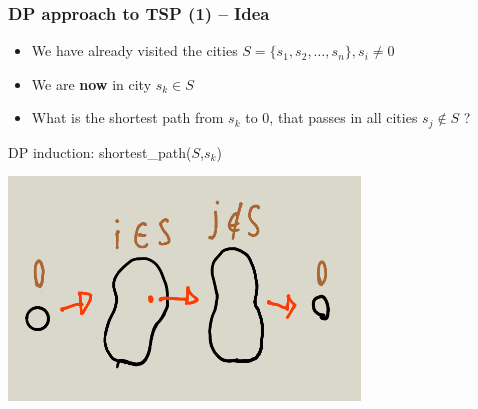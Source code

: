 \begin{frame}
  \frametitle{DP approach to TSP (1) -- Idea}

  {\smaller
    \begin{block}{}
      \begin{itemize}
      \item We have already visited the cities $S = \{s_1,s_2,\ldots,s_n\}, s_i \neq 0$
      \item We are {\bf now} in city $s_k \in S$
      \item What is the shortest path from $s_k$ to $0$, that passes in all cities $s_j \notin S$ ?
      \end{itemize}

      DP induction: shortest\_path($S$,$s_k$)
    \end{block}
    \begin{center}
      \includegraphics[width=0.7\textwidth]{img/DP_TSP}
    \end{center}
  }
\end{frame}

